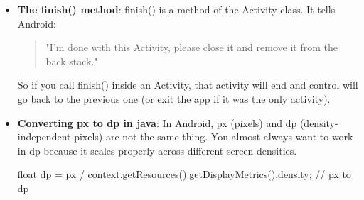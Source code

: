 \documentclass{report}
\begin{document}
\begin{itemize}
        \item \textbf{The finish() method}: finish() is a method of the Activity class. It tells Android:
            \begin{quote}
             "I’m done with this Activity, please close it and remove it from the back stack."
            \end{quote}
            So if you call finish() inside an Activity, that activity will end and control will go back to the previous one (or exit the app if it was the only activity).
        \item \textbf{Converting px to dp in java}: In Android, px (pixels) and dp (density-independent pixels) are not the same thing. You almost always want to work in dp because it scales properly across different screen densities.
            \bigbreak \noindent 
            \begin{javacode}
                float dp = px / context.getResources().getDisplayMetrics().density; // px to dp


\end{javacode}
\end{itemize}
\end{document}
